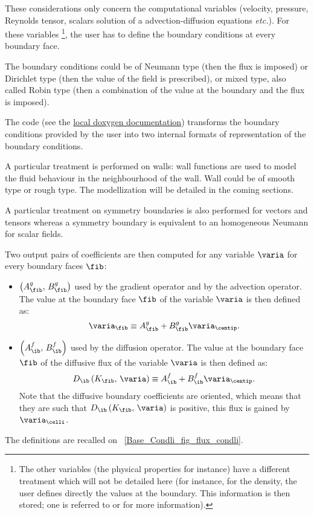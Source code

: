 These considerations only concern the computational variables  
(velocity, pressure, Reynolds tensor, 
scalars solution of a advection-diffusion equations \emph{etc.}). For these variables
\footnote{
The other variables 
(the physical properties for instance) have a different treatment which will 
not be detailed here (for instance, for the density, the user defines 
directly the values at the boundary. This information is then stored; one 
is referred to  or  for more information).
},
the user has to define the boundary conditions at every boundary face.

The boundary conditions could be of Neumann type (then the flux is imposed)
or Dirichlet type (then the value of the field is prescribed), or mixed type, also 
called Robin type (then a combination of the value at the boundary and the flux
is imposed).

The code (see the \href{../../../doxygen/src/html/condli_8f90.html}{local doxygen documentation}) transforms the boundary conditions provided by the user
 into two internal formats of representation of the boundary 
 conditions. 
 
 A particular treatment is performed on walls:
 wall functions are used to model the fluid behaviour in the neighbourhood of the wall.
 Wall could be of smooth type or rough type. The modellization will be detailed in the
 coming sections.
 
A particular treatment on symmetry boundaries is also performed for vectors and tensors
whereas a symmetry boundary is equivalent to an homogeneous Neumann for scalar fields.

Two output pairs of coefficients are then computed for any variable $\varia$ for every boundary faces $\fib$:

\begin{itemize}
\item $\left( A^g_\fib , \, B^g_\fib\right)$ used by the gradient operator and by the advection operator. 
The value at the boundary face $\fib$ of the variable $\varia$ is 
then defined as:
\begin{equation}\label{eq:bndcnd:coef_g_def}
\varia_\fib \equiv A^g_\fib + B^g_\fib \varia_\centip.
\end{equation}
%
\item $\left( A^f_\ib , \, B^f_\ib\right)$ used by the diffusion operator.
The value at the boundary face $\fib$ of the diffusive flux of the variable $\varia$ 
is then defined as:
\begin{equation}\label{eq:bndcnd:coef_f_def}
D_\ib \left( K_\fib , \, \varia \right) \equiv A^f_\ib + B^f_\ib  \varia_\centip.
\end{equation}
Note that the diffusive boundary coefficients are oriented, which means that they are such that $D_\ib \left( K_\fib , \, \varia \right) $ is positive, 
this flux is gained by $\varia_\celli$.
\end{itemize}
The definitions are recalled on \figurename~\ref{Base_Condli_fig_flux_condli}.

